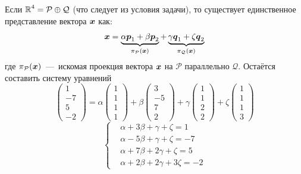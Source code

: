 \documentclass[a4paper,12pt]{article}
\begin{document}
  \begin{solution}
    Если $\RR^4 \hm= \mathcal P \oplus \mathcal Q$ (что следует из условия задачи), то существует единственное представление вектора $\boldsymbol x$ как:
    \[
      \boldsymbol x = \underbrace{\alpha \boldsymbol p_1 + \beta \boldsymbol p_2}_{\pi_{\mathcal P}(\boldsymbol x)} + \underbrace{\gamma \boldsymbol q_1 + \zeta \boldsymbol q_2}_{\pi_{\mathcal Q}(\boldsymbol x)}
    \]
    где $\pi_{\mathcal P}(\boldsymbol x)$~---~искомая проекция вектора $\boldsymbol x$ на $\mathcal P$ параллельно $\mathcal Q$.
    Остаётся составить систему уравнений
    \[
      \begin{pmatrix}
        1 \\ -7 \\ 5 \\ -2
      \end{pmatrix}
      = \alpha \begin{pmatrix}
        1 \\ 1 \\ 1 \\ 1
      \end{pmatrix} + \beta \begin{pmatrix}
        3 \\ -5 \\ 7 \\ 2
      \end{pmatrix} + \gamma \begin{pmatrix}
        1 \\ 1 \\ 2 \\ 2
      \end{pmatrix} + \zeta \begin{pmatrix}
        1 \\ 1 \\ 1 \\ 3
      \end{pmatrix}
    \]
    \[
      \left\{
        \begin{aligned}
          &\alpha + 3\beta + \gamma + \zeta = 1\\
          &\alpha - 5\beta + \gamma + \zeta = -7\\
          &\alpha + 7\beta + 2\gamma + \zeta = 5\\
          &\alpha + 2\beta + 2\gamma + 3\zeta = -2
        \end{aligned}
      \right.
    \]
    

\end{solution}
\end{document}

